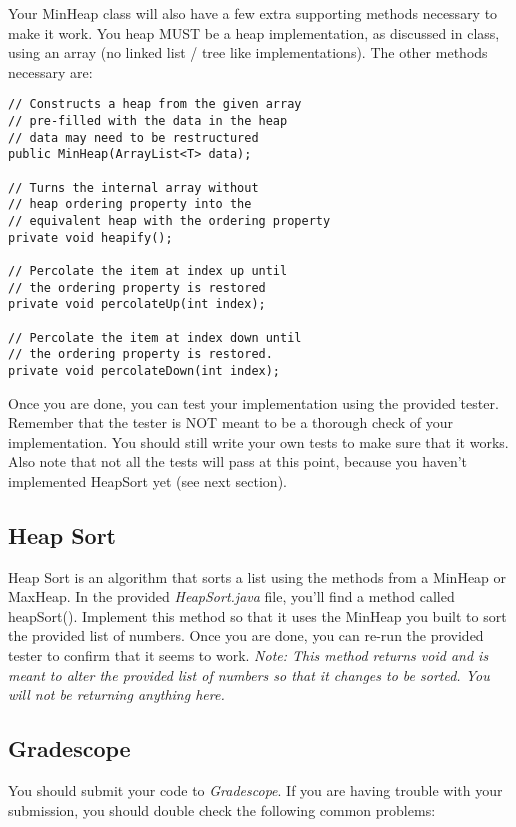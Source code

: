\documentclass[paper=a4, fontsize=11pt, parskip=full]{scrartcl} %
\numberwithin{equation}{section} %
\numberwithin{figure}{section} %
\numberwithin{table}{section} %
\begin{document}
Your MinHeap class will also have a few extra supporting methods necessary to make it work. You heap MUST be a heap implementation, as discussed in class, using an array (no linked list / tree like implementations). The other methods necessary are: 

\begin{lstlisting}
// Constructs a heap from the given array
// pre-filled with the data in the heap
// data may need to be restructured
public MinHeap(ArrayList<T> data);

// Turns the internal array without
// heap ordering property into the
// equivalent heap with the ordering property
private void heapify();

// Percolate the item at index up until
// the ordering property is restored
private void percolateUp(int index);

// Percolate the item at index down until
// the ordering property is restored.
private void percolateDown(int index);
\end{lstlisting}

Once you are done, you can test your implementation using the provided tester. Remember that the tester is NOT meant to be a thorough check of your implementation. You should still write your own tests to make sure that it works. Also note that not all the tests will pass at this point, because you haven't implemented HeapSort yet (see next section).

\subsection{Heap Sort}

Heap Sort is an algorithm that sorts a list using the methods from a MinHeap or MaxHeap. In the provided \emph{HeapSort.java} file, you'll find a method called heapSort(). Implement this method so that it uses the MinHeap you built to sort the provided list of numbers. Once you are done, you can re-run the provided tester to confirm that it seems to work. \emph{Note: This method returns void and is meant to alter the provided list of numbers so that it changes to be sorted. You will not be returning anything here.}


\subsection{Gradescope}

You should submit your code to \emph{Gradescope}. If you are having trouble with your submission, you should double check the following common problems:
\end{document}
